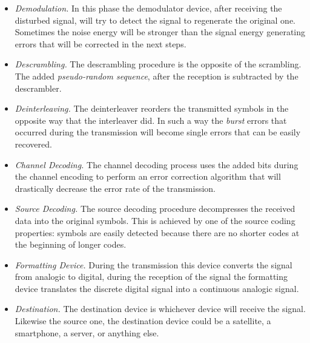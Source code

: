 \begin{itemize}
    \item \textsl{Demodulation.} In this phase the demodulator device, after receiving the disturbed signal, will try to detect the signal to regenerate the original one. Sometimes the noise energy will be stronger than the signal energy generating errors that will be corrected in the next steps.
    \item \textsl{Descrambling.} The descrambling procedure is the opposite of the scrambling. The added \textit{pseudo-random sequence}, after the reception is subtracted by the descrambler.
    \item \textsl{Deinterleaving.} The deinterleaver reorders the transmitted symbols in the opposite way that the interleaver did. In such a way the \textit{burst} errors that occurred during the transmission will become single errors that can be easily recovered.
    \item \textsl{Channel Decoding.} The channel decoding process uses the added bits during the channel encoding to perform an error correction algorithm that will drastically decrease the error rate of the transmission.
    \item \textsl{Source Decoding.} The source decoding procedure decompresses the received data into the original symbols. This is achieved by one of the source coding properties: symbols are easily detected because there are no shorter codes at the beginning of longer codes.
    \item \textsl{Formatting Device.} During the transmission this device converts the signal from analogic to digital, during the reception of the signal the formatting device translates the discrete digital signal into a continuous analogic signal. 
    \item \textsl{Destination.} The destination device is whichever device will receive the signal. Likewise the source one, the destination device could be a satellite, a smartphone, a server, or anything else.
\end{itemize}

